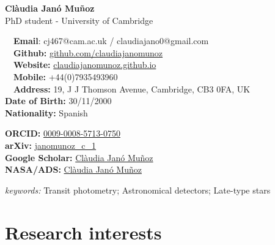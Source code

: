 \documentclass{article}
\begin{document}
\small %

\begin{center}
\huge
\textbf{Clàudia Janó Muñoz} \\
\normalsize
PhD student - University of Cambridge \\
\end{center}

\begin{minipage}[ht]{0.6\linewidth}
	\faEnvelope~~\textbf{Email}: cj467@cam.ac.uk / claudiajano0@gmail.com\\
	\faGithub~~\textbf{Github:} \href{https://github.com/claudiajanomunoz}{github.com/claudiajanomunoz}\\
	\faGlobe~~\textbf{Website:} \href{https://claudiajanomunoz.github.io}{claudiajanomunoz.github.io} \\
  \faPhone~~\textbf{Mobile:} +44(0)7935493960 \\
  \faMapMarker~~\textbf{Address:} 19, J J Thomson Avenue, Cambridge, CB3 0FA, UK \\
  \textbf{Date of Birth:} 30/11/2000 \\
  \textbf{Nationality:} Spanish \\
\end{minipage}
\begin{minipage}[ht]{0.34\linewidth}
	\begin{flushright}
    \textbf{ORCID:} \href{https://orcid.org/0009-0008-5713-0750}{0009-0008-5713-0750} \\
    \textbf{arXiv:} \href{http://arxiv.org/a/janomunoz_c_1}{janomunoz\_c\_1} \\
    \textbf{Google Scholar:} \href{https://scholar.google.com/citations?user=7sh8LMYAAAAJ&hl=en&oi=sra}{Clàudia Janó Muñoz} \\
    \textbf{NASA/ADS:} \href{https://ui.adsabs.harvard.edu/search/q=author%3A%22Janó%20Muñoz%2C%20C.%22&sort=date%20desc%2C%20bibcode%20desc&p_=0}{Clàudia Janó Muñoz} \\
	\end{flushright}
\end{minipage}

\vspace{0.6ex}
\noindent\textit{keywords:} Transit photometry; Astronomical detectors; Late-type stars 

\section*{Research interests}
\end{document}
